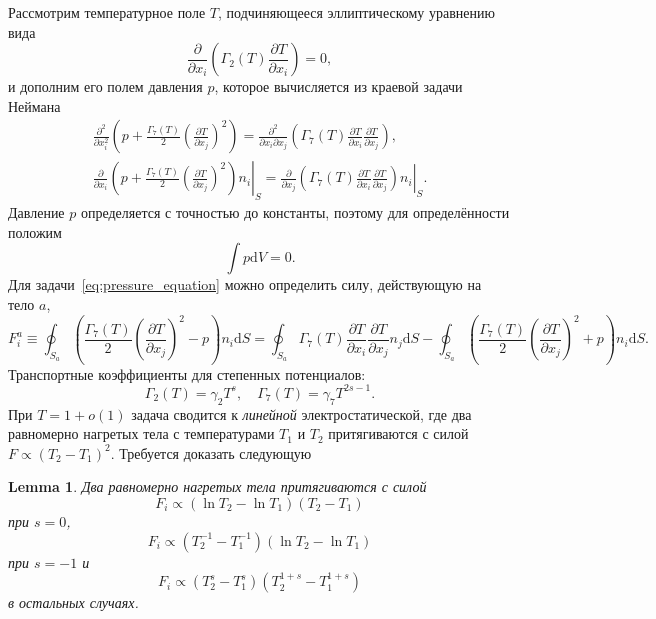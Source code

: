 \documentclass{article}
\theoremstyle{plain}
\newtheorem*{lemma}{Lemma}
\newcommand{\dd}{\mathrm{d}}
\newcommand{\pder}[2][]{\frac{\partial#1}{\partial#2}}
\newcommand{\pderdual}[2][]{\frac{\partial^2#1}{\partial#2^2}}
\newcommand{\pderder}[3][]{\frac{\partial^2#1}{\partial#2\partial#3}}
\newcommand{\eqdef}{\equiv}
\begin{document}
Рассмотрим температурное поле \(T\), подчиняющееся эллиптическому уравнению вида
\begin{equation}\label{eq:elliptic}
    \pder{x_i}\left( \Gamma_2(T) \pder[T]{x_i} \right) = 0,
\end{equation}
и дополним его полем давления \(p\), которое вычисляется из краевой задачи Неймана
\begin{gather}
    \pderdual{x_i}\left( p + \frac{\Gamma_7(T)}{2}\left(\pder[T]{x_j}\right)^2 \right) =
    \pderder{x_i}{x_j}\left( \Gamma_7(T)\pder[T]{x_i}\pder[T]{x_j} \right), \label{eq:pressure_equation}\\
    \pder{x_i}\left.\left( p + \frac{\Gamma_7(T)}{2}\left(\pder[T]{x_j}\right)^2 \right)n_i\right|_S =
    \pder{x_j}\left.\left( \Gamma_7(T)\pder[T]{x_i}\pder[T]{x_j} \right)n_i\right|_S. \label{eq:pressure_boundary}
\end{gather}
Давление \(p\) определяется с точностью до константы, поэтому для определённости положим
\begin{equation}\label{eq:pressure_integral}
    \int p\dd{V} = 0.
\end{equation}
Для задачи~\eqref{eq:pressure_equation} можно определить силу, действующую на тело \(a\),
\begin{equation}\label{eq:force_ell}
    F^a_i \eqdef \oint_{S_a} \left( \frac{\Gamma_7(T)}{2}\left(\pder[T]{x_j}\right)^2 - p \right) n_i\dd{S} =
    \oint_{S_a} \Gamma_7(T)\pder[T]{x_i}\pder[T]{x_j} n_j\dd{S} -
    \oint_{S_a} \left( \frac{\Gamma_7(T)}{2}\left(\pder[T]{x_j}\right)^2 + p \right) n_i\dd{S}.
\end{equation}
Транспортные коэффициенты для степенных потенциалов:
\begin{equation}\label{eq:gammas}
    \Gamma_2(T) = \gamma_2 T^s, \quad \Gamma_7(T) = \gamma_7 T^{2s-1}.
\end{equation}
При \(T=1+o(1)\) задача сводится к \emph{линейной} электростатической,
где два равномерно нагретых тела с температурами \(T_1\) и \(T_2\) притягиваются с силой \(F \propto (T_2-T_1)^2\).
Требуется доказать следующую
\begin{lemma}\label{lem:force}
    Два равномерно нагретых тела притягиваются с силой
    \begin{equation}\label{eq:force_temp_0}
        F_i \propto \left( \ln{T_2}-\ln{T_1} \right)\left( T_2 - T_1 \right)
    \end{equation}
    при \(s=0\),
    \begin{equation}\label{eq:force_temp_-1}
        F_i \propto \left( T_2^{-1} - T_1^{-1} \right)\left( \ln{T_2}-\ln{T_1} \right)
    \end{equation}
    при \(s=-1\) и
    \begin{equation}\label{eq:force_temp}
        F_i \propto \left( T_2^s - T_1^s \right)\left( T_2^{1+s} - T_1^{1+s} \right)
    \end{equation}
    в остальных случаях.
\end{lemma}
\end{document}
